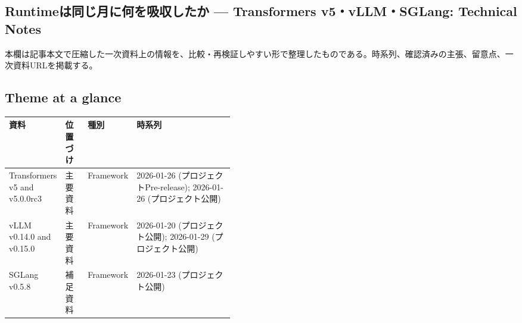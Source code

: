 \subsection*{Runtimeは同じ月に何を吸収したか — Transformers v5・vLLM・SGLang: Technical Notes}
本欄は記事本文で圧縮した一次資料上の情報を、比較・再検証しやすい形で整理したものである。時系列、確認済みの主張、留意点、一次資料URLを掲載する。
\medskip
\subsection*{Theme at a glance}
\begin{center}
\footnotesize
\begin{tabularx}{\linewidth}{@{}p{0.20\linewidth}p{0.10\linewidth}p{0.14\linewidth}X@{}}
\toprule
資料 & 位置づけ & 種別 & 時系列 \\
\midrule
Transformers v5 and v5.0.0rc3 & 主要資料 & Framework & 2026-01-26 (プロジェクトPre-release); 2026-01-26 (プロジェクト公開) \\
vLLM v0.14.0 and v0.15.0 & 主要資料 & Framework & 2026-01-20 (プロジェクト公開); 2026-01-29 (プロジェクト公開) \\
SGLang v0.5.8 & 補足資料 & Framework & 2026-01-23 (プロジェクト公開) \\
\bottomrule
\end{tabularx}
\end{center}
\normalsize

